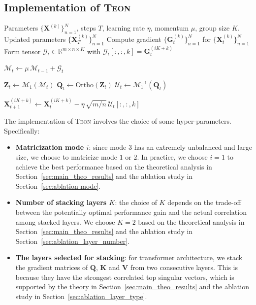\documentclass{article}
\newcommand{\ten}[1]{\bm{\mathcal{#1}}}
\newcommand{\mat}[1]{\mathbf{#1}}
\theoremstyle{plain}
\theoremstyle{definition}
\theoremstyle{remark}
\begin{document}
\subsection{Implementation of \textsc{Teon}}
\label{sec:implementation}
\begin{algorithm}[h]
\caption{\textsc{Teon} (mode-1 orthogonalization)}
\label{alg:teon_mode1}
\begin{algorithmic}[1]
\small
\REQUIRE Parameters $\{\mathbf{X}^{(k)}\}_{n=1}^N$, steps $T$, learning rate $\eta$, momentum $\mu$, group size $K$.
\ENSURE Updated parameters $\{\mathbf{X}^{(k)}_{T}\}_{n=1}^N$
    \STATE Compute gradient $\{\mathbf{G}^{(k)}_{t}\}_{n=1}^N$ for $\{\mathbf{X}^{(k)}_{t}\}_{n=1}^N$
        \STATE Form tensor $\ten{G}_t\in\mathbb{R}^{m\times n\times K}$ with $\ten{G}_t[:,:,k] = \mathbf{G}^{(iK+k)}_{t}$
    
        \STATE $\ten{M}_t \leftarrow \mu\,\ten{M}_{t-1} + \ten{G}_t$
    
        \STATE $\mathbf{Z}_t \leftarrow \mathcal{M}_1(\ten{M}_t)$ 
        \STATE $\mathbf{Q}_t \leftarrow \mathrm{Ortho}(\mathbf{Z}_t)$ 
        \STATE $\ten{U}_t \leftarrow \mathcal{M}_1^{-1}(\mathbf{Q}_t)$
    
            \STATE $\mathbf{X}^{(iK+k)}_{t+1} \leftarrow \mathbf{X}^{(iK+k)}_{t} - \eta\,\sqrt{m/n}\,\ten{U}_t[:,:,k]$
        \ENDFOR
    \ENDFOR
\ENDFOR

\end{algorithmic}
\end{algorithm}
The implementation of \textsc{Teon} involves the choice of some hyper-parameters. Specifically:
\begin{itemize}
\vspace{-5pt}
    \item {\bf Matricization mode $i$}: since mode $3$ has an extremely unbalanced and large size, we choose to matricize mode $1$ or $2$. In practice, we choose $i=1$ to achieve the best performance based on the theoretical analysis in Section~\ref{sec:main_theo_results} and the ablation study in Section~\ref{sec:ablation-mode}. 
    \vspace{-5pt}
    \item {\bf Number of stacking layers $K$}: the choice of $K$ depends on the trade-off between the potentially optimal performance gain and the actual correlation among stacked layers. We choose $K=2$ based on the theoretical analysis in Section~\ref{sec:main_theo_results} and the ablation study in Section~\ref{sec:ablation_layer_number}.
    \vspace{-5pt}
    \item {\bf The layers selected for stacking}: for transformer architecture, we stack the gradient matrices of $\mat{Q}$, $\mat{K}$ and $\mat{V}$ from two consecutive layers. This is because they have the strongest correlated top singular vectors, which is supported by the theory in Section~\ref{sec:main_theo_results} and the ablation study in Section~\ref{sec:ablation_layer_type}. 
\end{itemize}
\end{document}
